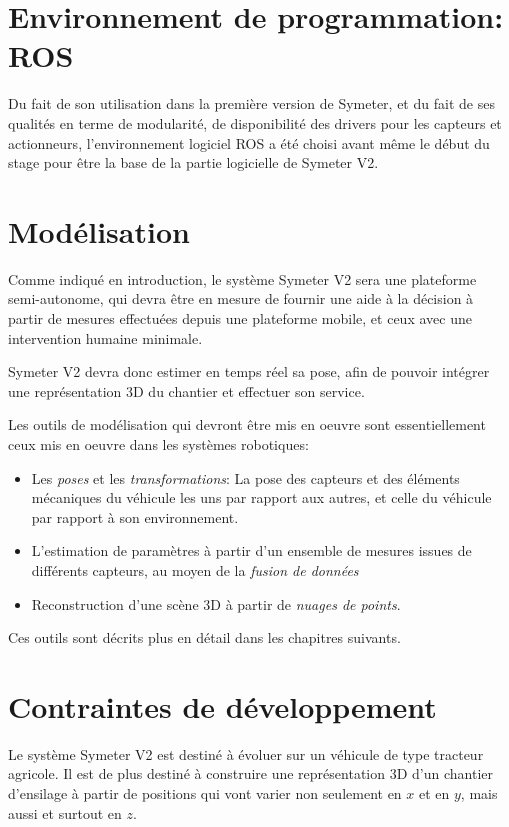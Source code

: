 \documentclass[12pt,a4paper]{report}
\begin{document}
		
		
	\section{Environnement de programmation: ROS}
	Du fait de son utilisation dans la première version de Symeter, et du fait de ses qualités en terme de modularité, de disponibilité des drivers pour les capteurs et actionneurs, l'environnement logiciel ROS a été choisi avant même le début du stage pour être la base de la partie logicielle de Symeter V2.

		
	\section{Modélisation}
	
	\para Comme indiqué en introduction, le système Symeter V2 sera une plateforme semi-autonome, qui devra être en mesure de fournir une aide à la décision à partir de mesures effectuées depuis une plateforme mobile, et ceux avec une intervention humaine minimale.
	
	\para Symeter V2 devra donc estimer en temps réel sa pose, afin de pouvoir intégrer une représentation 3D du chantier et effectuer son service.
	
	\para Les outils de modélisation qui devront être mis en oeuvre sont essentiellement ceux mis en oeuvre dans les systèmes robotiques:
	 \begin{itemize}
	 	\item Les \textit{poses} et les \textit{transformations}: La pose des capteurs et des éléments mécaniques du véhicule les uns par rapport aux autres, et celle du véhicule par rapport à son environnement.
	 	\item L'estimation de paramètres à partir d'un ensemble de mesures issues de différents capteurs, au moyen de la \textit{fusion de données}
	 	\item Reconstruction d'une scène 3D à partir de \textit{nuages de points}.
	 \end{itemize} 
 
   \para Ces outils sont décrits plus en détail dans les chapitres suivants.
			
	
	\section{Contraintes de développement}
		Le système Symeter V2 est destiné à évoluer sur un véhicule de type tracteur agricole. Il est de plus destiné à construire une représentation 3D d'un chantier d'ensilage à partir de positions qui vont varier non seulement en $x$ et en $y$, mais aussi et surtout en $z$.
		
\end{document}
